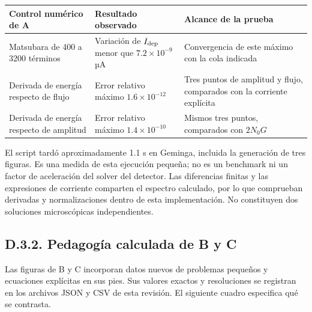 \documentclass[
  spanish,
  10pt,
  a4paper,
]{article}
\newcounter{none} %
\begin{document}
{\def\LTcaptype{none} %
\begin{longtable}[]{@{}
  >{\raggedright\arraybackslash}p{}
  >{\raggedright\arraybackslash}p{}
  >{\raggedright\arraybackslash}p{}@{}}
\toprule\noalign{}
\begin{minipage}[b]{\linewidth}\raggedright
Control numérico de A
\end{minipage} & \begin{minipage}[b]{\linewidth}\raggedright
Resultado observado
\end{minipage} & \begin{minipage}[b]{\linewidth}\raggedright
Alcance de la prueba
\end{minipage} \\
\midrule\noalign{}
\endhead
\bottomrule\noalign{}
\endlastfoot
Matsubara de 400 a 3200 términos & Variación de \(I_{\rm dep}\) menor
que \(7.2\times10^{-9}\) µA & Convergencia de este máximo con la cola
indicada \\
Derivada de energía respecto de flujo & Error relativo máximo
\(1.6\times10^{-12}\) & Tres puntos de amplitud y flujo, comparados con
la corriente explícita \\
Derivada de energía respecto de amplitud & Error relativo máximo
\(1.4\times10^{-10}\) & Mismos tres puntos, comparados con \(2N_0G\) \\
\end{longtable}
}

El script tardó aproximadamente 1.1 s en Geminga, incluida la generación
de tres figuras. Es una medida de esta ejecución pequeña; no es un
benchmark ni un factor de aceleración del solver del detector. Las
diferencias finitas y las expresiones de corriente comparten el espectro
calculado, por lo que comprueban derivadas y normalizaciones dentro de
esta implementación. No constituyen dos soluciones microscópicas
independientes.

\subsection{D.3.2. Pedagogía calculada de B y
C}\label{d.3.2.-pedagoguxeda-calculada-de-b-y-c}

Las figuras de B y C incorporan datos nuevos de problemas pequeños y
ecuaciones explícitas en sus pies. Sus valores exactos y resoluciones se
registran en los archivos JSON y CSV de esta revisión. El siguiente
cuadro especifica qué se contrasta.
\end{document}
